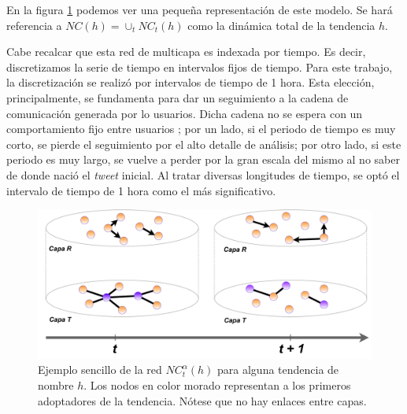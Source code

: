 \documentclass[../main.tex]{subfiles}
\begin{document}
En la figura \ref{fig:rep_network_model} podemos ver una pequeña representación de este modelo. Se hará referencia a $NC(h) = \cup_{t} NC_{t}(h)$ como la dinámica total de la tendencia $h$.




Cabe recalcar que esta red de multicapa  es indexada por tiempo. Es decir, discretizamos la serie de tiempo en intervalos fijos de tiempo. Para este trabajo, la discretización se realizó por intervalos de tiempo de 1 hora. Esta elección, principalmente, se fundamenta para dar un seguimiento a la cadena de comunicación generada por lo usuarios. Dicha cadena no se espera con un comportamiento fijo entre usuarios \cite{Miritello2013}; por un lado, si el periodo de tiempo es muy corto, se pierde el seguimiento por el alto detalle de análisis; por otro lado, si este periodo es muy largo, se vuelve a perder por la gran escala del mismo al no saber de donde nació el \textit{tweet} inicial. Al tratar diversas longitudes de tiempo, se optó el intervalo de tiempo de 1 hora como el más significativo.








\begin{figure}
    \centering
    \includegraphics[scale = 0.27]{images/metodologia_multiplexnetwork.drawio.pdf}
    \caption{Ejemplo sencillo de la red $NC^{\alpha}_{t} (h)$ para alguna tendencia de nombre $h$.  Los nodos en color morado representan a los primeros adoptadores de la tendencia. Nótese que no hay enlaces entre capas.}
    \label{fig:rep_network_model}
\end{figure}



\end{document}
